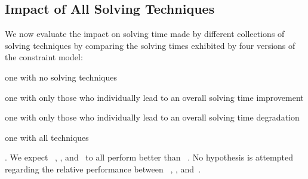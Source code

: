 \subsection{Impact of All Solving Techniques}

We now evaluate the impact on solving time made by different collections of
solving techniques by comparing the solving times exhibited by four versions of
the \gls{constraint model}:
%
\begin{modelList}
  \item {}
    one with no solving techniques
  \item {}
    one with only those who individually lead to an overall solving time
    improvement
  \item {}
    one with only those who individually lead to an overall solving time
    degradation
  \item {}
    one with all techniques
\end{modelList}.
%
We expect ~,
, and~ to all perform
better than ~.
%
No hypothesis is attempted regarding the relative performance between
~,
, and~.


